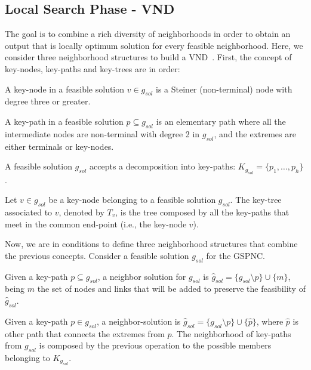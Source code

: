 \documentclass{llncs}
\begin{document}
\subsection{Local Search Phase - VND}
The goal is to combine a rich diversity of neighborhoods in order to obtain an output that is locally optimum solution for every feasible neighborhood. Here, we consider three neighborhood structures to build a VND~\cite{50}.  
First, the concept of key-nodes, key-paths and key-trees are in order: 
\begin{definition}
A key-node in a feasible solution $v \in g_{sol}$ is a Steiner (non-terminal) node with degree three or greater.
\end{definition}

\begin{definition}
A key-path in a feasible solution $p \subseteq g_{sol}$ is an elementary path 
where all the intermediate nodes are non-terminal with degree 2 in $g_{sol}$, 
and the extremes are either terminals or key-nodes.
\end{definition}

A feasible solution $g_{sol}$ accepts a decomposition into key-paths: $K_{g_{sol}}=\{p_1,\ldots,p_h\}$. 
 
\begin{definition}
Let $v \in g_{sol}$ be a key-node belonging to a feasible solution $g_{sol}$. 
The key-tree associated to $v$, denoted by $T_v$, is the tree composed by all the 
key-paths that meet in the common end-point (i.e., the key-node $v$).
\end{definition}

Now, we are in conditions to define three neighborhood structures that combine the previous concepts. 
Consider a feasible solution $g_{sol}$ for the GSPNC. 

\begin{definition}
Given a key-path $p \subseteq g_{sol}$, a neighbor solution for $g_{sol}$ is 
$\hat{g}_{sol} = \{ g_{sol}\setminus p \}\cup \{m\}$, 
being $m$ the set of nodes and links that will be added to preserve the feasibility of ${\hat{g}}_{sol}$.  
\end{definition}

\begin{definition}
Given a key-path $p \in g_{sol}$, a neighbor-solution is 
${\hat{g}}_{sol} = \{g_{sol} \setminus p \} \cup \{\hat{p}\}$, 
where $\hat{p}$ is other path that connects the extremes from $p$.  
The neighborhood of key-paths from $g_{sol}$ is composed by the previous operation 
to the possible members belonging to $K_{g_{sol}}$. 
\end{definition}
\end{document}
